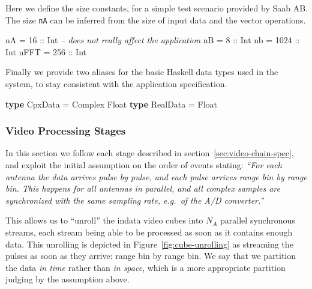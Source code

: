 \documentclass[
  a4paper,
]{article}
\newenvironment{Shaded}{}{}
\newcommand{\CommentTok}[1]{\textcolor[rgb]{0.38,0.63,0.69}{\textit{#1}}}
\newcommand{\DataTypeTok}[1]{\textcolor[rgb]{0.56,0.13,0.00}{#1}}
\newcommand{\DecValTok}[1]{\textcolor[rgb]{0.25,0.63,0.44}{#1}}
\newcommand{\FunctionTok}[1]{\textcolor[rgb]{0.02,0.16,0.49}{#1}}
\newcommand{\KeywordTok}[1]{\textcolor[rgb]{0.00,0.44,0.13}{\textbf{#1}}}
\newcommand{\NormalTok}[1]{#1}
\newcommand{\OtherTok}[1]{\textcolor[rgb]{0.00,0.44,0.13}{#1}}
\begin{document}
Here we define the size constants, for a simple test scenario provided
by Saab AB. The size \texttt{nA} can be inferred from the size of input
data and the vector operations.

\begin{Shaded}
\begin{Highlighting}[numbers=left,,firstnumber=105,]
\NormalTok{nA   }\FunctionTok{=}   \DecValTok{16}\OtherTok{ ::} \DataTypeTok{Int} \CommentTok{-- does not really affect the application}
\NormalTok{nB   }\FunctionTok{=}    \DecValTok{8}\OtherTok{ ::} \DataTypeTok{Int}
\NormalTok{nb   }\FunctionTok{=} \DecValTok{1024}\OtherTok{ ::} \DataTypeTok{Int}
\NormalTok{nFFT }\FunctionTok{=}  \DecValTok{256}\OtherTok{ ::} \DataTypeTok{Int}
\end{Highlighting}
\end{Shaded}

Finally we provide two aliases for the basic Haskell data types used in
the system, to stay consistent with the application specification.

\begin{Shaded}
\begin{Highlighting}[numbers=left,,firstnumber=113,]
\KeywordTok{type} \DataTypeTok{CpxData}  \FunctionTok{=} \DataTypeTok{Complex} \DataTypeTok{Float}
\KeywordTok{type} \DataTypeTok{RealData} \FunctionTok{=} \DataTypeTok{Float}
\end{Highlighting}
\end{Shaded}

\hypertarget{video-processing-stages}{%
\subsubsection{Video Processing Stages}\label{video-processing-stages}}

In this section we follow each stage described in
section~\ref{sec:video-chain-spec}, and exploit the initial assumption
on the order of events stating: \emph{``For each antenna the data
arrives \emph{pulse by pulse}, and each pulse arrives \emph{range bin by
range bin}. This happens \emph{for all antennas in parallel}, and all
complex samples are synchronized with the same sampling rate, e.g.~of
the A/D converter.''}

This allows us to ``unroll'' the indata video cubes into \(N_A\)
parallel synchronous streams, each stream being able to be processed as
soon as it contains enough data. This unrolling is depicted in
Figure~\ref{fig:cube-unrolling} as streaming the pulses as soon as they
arrive: range bin by range bin. We say that we partition the data
\emph{in time} rather than \emph{in space}, which is a more appropriate
partition judging by the assumption above.
\end{document}
